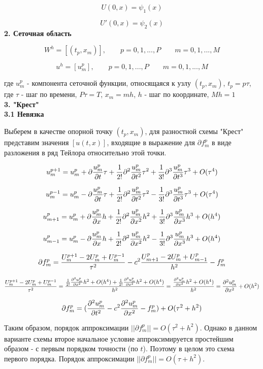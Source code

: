 \documentclass[a4paper]{article}
\begin{document}
$$U(0,x)=\psi_1(x)$$

$$U'(0,x)=\psi_2(x)$$
\textbf{2. Сеточная область}

$$W^h=[(t_p,x_m)], \qquad p=0,1,...,P \qquad m=0,1,...,M$$

$$u^h=[u_m^p], \qquad p=0,1,...,P \qquad m=0,1,...,M$$

где $u_m^p$ - компонента сеточной функции, относящаяся к узлу $(t_p,x_m)$, $t_p=p\tau$, где $\tau$ - шаг по времени, $P\tau=T$, $x_m=mh$, $h$ - шаг по координате, $Mh=1$ \\
\textbf{3. "Крест"} \\
\textbf{3.1 Невязка}

Выберем в качестве опорной точку $(t_p,x_m)$, для разностной схемы "Крест" представим значения $[u(t,x)]$, входящие в выражение для $\partial{f_m^p}$ в виде разложения в ряд Тейлора относительно этой точки.

$$u_m^{p+1}=u_m^p + {\partial{u_m^p \over \partial{t}}\tau} + {1 \over 2!}{\partial^2{u_m^p \over \partial{t^2}}\tau^2} + {1 \over 3!}{\partial^3{u_m^p \over \partial{t^3}}\tau^3} + O(\tau^4) $$

$$u_m^{p-1}=u_m^p - {\partial{u_m^p \over \partial{t}}\tau} + {1 \over 2!}{\partial^2{u_m^p \over \partial{t^2}}\tau^2} - {1 \over 3!}{\partial^3{u_m^p \over \partial{t^3}}\tau^3} + O(\tau^4) $$

$$u_{m+1}^p=u_m^p + {\partial{u_m^p \over \partial{x}}h} + {1 \over 2!}{\partial^2{u_m^p \over \partial{x^2}}h^2} + {1 \over 3!}{\partial^3{u_m^p \over \partial{x^3}}h^3} + O(h^4) $$

$$u_{m-1}^p=u_m^p - {\partial{u_m^p \over \partial{x}}h} + {1 \over 2!}{\partial^2{u_m^p \over \partial{x^2}}h^2} - {1 \over 3!}{\partial^3{u_m^p \over \partial{x^3}}h^3} + O(h^4) $$

$$\partial{f_m^p}={U_m^{p+1}-2U_m^p+U_m^{p-1} \over \tau^2} - c^2{U_{m+1}^p-2U_m^p+U_{m-1}^p \over h^2} - f_m^p $$

$${U_m^{p+1}-2U_m^p+U_m^{p-1} \over \tau^2} = {{1 \over 2!}{\partial^2 {u_m^p} \over \partial{x^2}}h^2 + O(h^4) + {1 \over 2!}{\partial^2 {u_m^p} \over \partial{x^2}} h^2 + O(h^4) \over h^2 } = {{\partial^2 {u_m^p} \over \partial{x^2}} h^2 + O(h^4) \over h^2} = {\partial^2 {u_m^p} \over \partial{x^2}}  + O(h^2) $$

$$\partial{f_m^p}= ({{\partial^2 {u_m^p} \over \partial{t^2}} - c^2 {\partial^2 {u_m^p} \over \partial{x^2}} - f_m^p }) + O(\tau^2+h^2)$$

Таким образом, порядок аппроксимации $||\partial{f_m^p}||=O(\tau^2+h^2)$. Однако в данном варианте схемы второе начальное условие аппроксимируется простейшим образом - с первым порядком точности (по $t$). Поэтому в целом это схема первого порядка. Порядок аппроксимации $||\partial{f_m^p}||=O(\tau+h^2)$.
\end{document}

